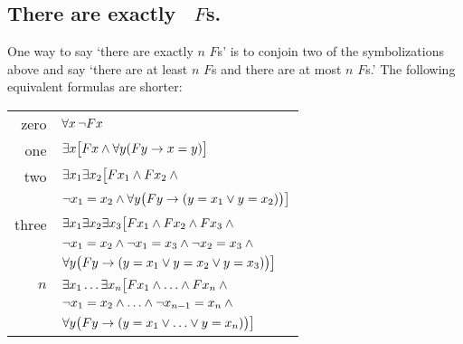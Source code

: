 \subsection*{There are exactly \blank\ $F$s.}
\label{summary.exactly}

One way to say `there are exactly $n$ $F$s' is to conjoin two of the symbolizations above and say `there are at least $n$ $F$s and there are at most $n$ $F$s.' The following equivalent formulas are shorter:
\begin{tabular*}{\textwidth}{rl}
zero & $\forall x\,\neg \mathord{F}x$\\
one & $\exists x\bigl[\mathord{F}x \wedge \forall y(\mathord{F}y \rightarrow x = y)\bigr]$\\
two & $\exists x_1\exists x_2\bigl[\mathord{F}x_1 \wedge \mathord{F}x_2 \wedge {}$\\
& $\neg x_1 = x_2 \wedge \forall y\bigl(\mathord{F}y \rightarrow (y= x_1 \vee y = x_2)\bigr) \bigr]$\\
three & $\exists x_1\exists x_2\exists x_3\bigl[\mathord{F}x_1 \wedge \mathord{F}x_2 \wedge \mathord{F}x_3 \wedge {}$\\
& $\neg x_1 =  x_2 \wedge \neg  x_1 = x_3 \wedge \neg x_2 = x_3 \wedge {}$\\
& $\forall y\bigl(\mathord{F}y \rightarrow (y = x_1 \vee y = x_2 \vee y =  x_3)\bigr) \bigr]$\\
$n$ & $\exists x_1\ldots\exists x_n\bigl[\mathord{F}x_1 \wedge\ldots\wedge \mathord{F}x_n  \wedge {}$\\
&$ \neg x_1 = x_2 \wedge\ldots\wedge \neg x_{n-1}= x_n \wedge \phantom{.}$\\
& $\forall y\bigl(\mathord{F}y \rightarrow (y= x_1 \vee \ldots \vee y= x_n)\bigr)\bigr]$ 
\end{tabular*}

